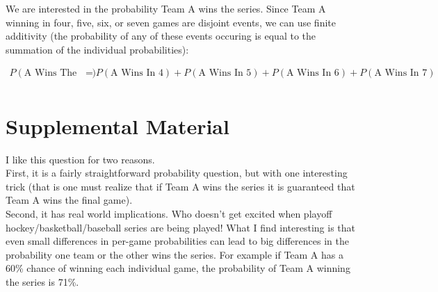 \documentclass{article}
\begin{document}
We are interested in the probability Team A wins the series. Since Team A winning in four, five, six, or seven games are disjoint events, we can use finite additivity (the probability of any of these events occuring is equal to the summation of the individual probabilities):

\begin{equation} 
\begin{split}
P(\text{A Wins The Series}) &=  P(\text{A Wins In 4}) + P(\text{A Wins In 5}) + P(\text{A Wins In 6}) + P(\text{A Wins In 7})\\
\end{split}
\end{equation}

\newpage

\section{Supplemental Material}

I like this question for two reasons.\\

First, it is a fairly straightforward probability question, but with one interesting trick (that is one must realize that if Team A wins the series it is guaranteed that Team A wins the final game).\\

Second, it has real world implications. Who doesn't get excited when playoff hockey/basketball/baseball series are being played! What I find interesting is that even small differences in per-game probabilities can lead to big differences in the probability one team or the other wins the series. For example if Team A has a 60\% chance of winning each individual game, the probability of Team A winning the series is 71\%.\\
\end{document}
